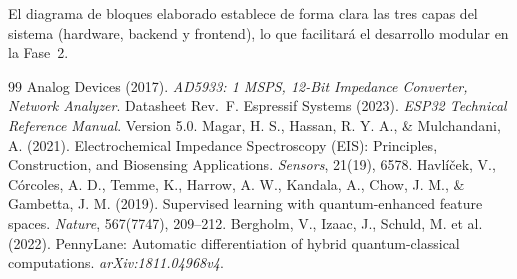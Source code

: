 \documentclass[11pt,a4paper,spanish]{book}
\begin{document}
El diagrama de bloques elaborado establece de forma clara las tres capas del sistema (hardware, backend y frontend), lo que facilitar\'{a} el desarrollo modular en la Fase~2.

\begin{thebibliography}{99}
 Analog Devices (2017). \emph{AD5933: 1 MSPS, 12-Bit Impedance Converter, Network Analyzer}. Datasheet Rev.~F.
 Espressif Systems (2023). \emph{ESP32 Technical Reference Manual}. Version 5.0.
 Magar, H. S., Hassan, R. Y. A., \& Mulchandani, A. (2021). Electrochemical Impedance Spectroscopy (EIS): Principles, Construction, and Biosensing Applications. \emph{Sensors}, 21(19), 6578.
 Havl\'{i}\v{c}ek, V., C\'{o}rcoles, A. D., Temme, K., Harrow, A. W., Kandala, A., Chow, J. M., \& Gambetta, J. M. (2019). Supervised learning with quantum-enhanced feature spaces. \emph{Nature}, 567(7747), 209--212.
 Bergholm, V., Izaac, J., Schuld, M. et al. (2022). PennyLane: Automatic differentiation of hybrid quantum-classical computations. \emph{arXiv:1811.04968v4}.
\end{thebibliography}
\end{document}
